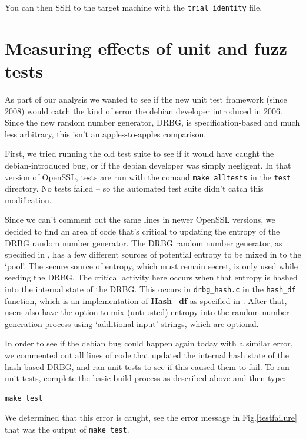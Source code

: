 \documentclass[conference]{IEEEtran}
\begin{document}
You can then SSH to the target machine with the \verb|trial_identity|
file.


\section{Measuring effects of unit and fuzz tests}

As part of our analysis we wanted to see if the new unit test
framework (since 2008) would catch the kind of error the debian
developer introduced in 2006. Since the new random number generator,
DRBG, is specification-based and much less arbitrary, this isn't an
apples-to-apples comparison.

First, we tried running the old test suite to see if it would have
caught the debian-introduced bug, or if the debian developer was
simply negligent. In that version of OpenSSL, tests are run with the
comand \verb|make alltests| in the \verb|test| directory.  No tests
failed -- so the automated test suite didn't catch this modification.

Since we can't comment out the same lines in newer OpenSSL versions,
we decided to find an area of code that's critical to updating the
entropy of the DRBG random number generator. The DRBG random number
generator, as specified in \cite{12}, has a few different sources of
potential entropy to be mixed in to the `pool'. The secure source of
entropy, which must remain secret, is only used while seeding the
DRBG. The critical activity here occurs when that entropy is hashed
into the internal state of the DRBG. This occurs in \verb|drbg_hash.c|
in the \verb|hash_df| function, which is an implementation of
\textbf{Hash\_df} as specified in \cite{12}. After that, users also
have the option to mix (untrusted) entropy into the random number
generation process using `additional input' strings, which are
optional.

In order to see if the debian bug could happen again today with a
similar error, we commented out all lines of code that updated the
internal hash state of the hash-based DRBG, and ran unit tests to see
if this caused them to fail. To run unit tests, complete the basic
build process as described above and then type:

\begin{verbatim}
make test
\end{verbatim}

We determined that this error is caught, see the error message in
Fig.\ref{testfailure} that was the output of \verb|make test|.
\end{document}
